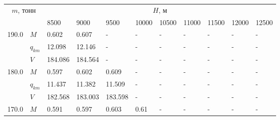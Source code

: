 \begin{tabular}{|l|l|lllllllll|}\hline
\multicolumn{2}{|c|}{$m$, тонн}& \multicolumn{9}{c|}{$H$, м}\\ 
 \cline{3-11}
 \multicolumn{2}{|c|}{}&                      8500 &                      9000 &                      9500 &                     10000 &                     10500 &                     11000 &                     11500 &                     12000 &                     12500 \\
\hline
190.0 & $M$ &    0.602\cellcolor{green} &                     0.607 &                         - &                         - &                         - &                         - &                         - &                         - &                         - \\
      & $q_{km}$ &   12.098\cellcolor{green} &                    12.146 &                         - &                         - &                         - &                         - &                         - &                         - &                         - \\
      & $V$ &  184.086\cellcolor{green} &                   184.564 &                         - &                         - &                         - &                         - &                         - &                         - &                         - \\
\hline
180.0 & $M$ &                     0.597 &    0.602\cellcolor{green} &                     0.609 &                         - &                         - &                         - &                         - &                         - &                         - \\
      & $q_{km}$ &                    11.437 &   11.382\cellcolor{green} &                    11.509 &                         - &                         - &                         - &                         - &                         - &                         - \\
      & $V$ &                   182.568 &  183.003\cellcolor{green} &                   183.598 &                         - &                         - &                         - &                         - &                         - &                         - \\
\hline
170.0 & $M$ &                     0.591 &    0.597\cellcolor{green} &                     0.603 &                      0.61 &                         - &                         - &                         - &                         - &                         - \\

\end{tabular}
